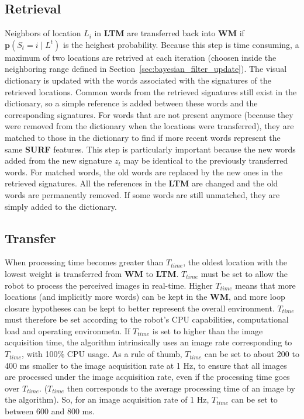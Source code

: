 \subsection{Retrieval}
\label{sec:retrieval}
Neighbors of location $L_i$ in \textbf{LTM} are transferred back into \textbf{WM} if $\mathbf{p}(S_t=i \mid L^t)$ is the heighest probability. Because this step is time consuming, a maximum of two locations are retrived at each iteration (choosen inside the neighboring range defined in Section~\ref{sec:bayesian_filter_update}). The visual dictionary is updated with the words associated with the signatures of the retrieved locations. Common words from the retrieved signatures still exist in the dictionary, so a simple reference is added between these words and the corresponding signatures. For words that are not present anymore (because they were removed from the dictionary when the locations were transferred), they are matched to those in the dictionary to find if more recent words represent the same \textbf{SURF} features. This step is particularly important because the new words added from the new signature $z_t$ may be identical to the previously transferred words. For matched words, the old words are replaced by the new ones in the retrieved signatures. All the references in the \textbf{LTM} are changed and the old words are permanently removed. If some words are still unmatched, they are simply added to the dictionary.

\subsection{Transfer}
When processing time becomes greater than $T_{time}$, the oldest location with the lowest weight is transferred from \textbf{WM} to \textbf{LTM}. $T_{time}$ must be set to allow the robot to process the perceived images in real-time. Higher $T_{time}$ means that more locations (and implicitly more words) can be kept in the \textbf{WM}, and more loop closure hypotheses can be kept to better represent the overall environment. $T_{time}$ must therefore be set according to the robot's CPU capabilities, computational load and operating environmetn. If $T_{time}$ is set to higher than the image acquisition time, the algorithm intrinsically uses an image rate corresponding to $T_{time}$, with 100\% CPU usage. As a rule of thumb, $T_{time}$ can be set to about 200 to 400 ms smaller to the image acquisition rate at 1 Hz, to ensure that all images are processed under the image acquisition rate, even if the processing time goes over $T_{time}$. ($T_{time}$ then corresponds to the average processing time of an image by the algorithm). So, for an image acquisition rate of 1 Hz, $T_{time}$ can be set to between 600 and 800 ms.

